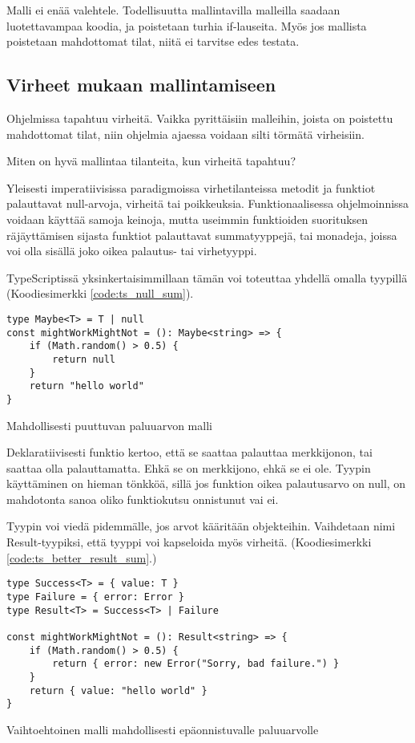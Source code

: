 Malli ei enää valehtele. Todellisuutta mallintavilla malleilla saadaan luotettavampaa koodia, ja poistetaan turhia if-lauseita. Myös jos mallista poistetaan mahdottomat tilat, niitä ei tarvitse edes testata.

\subsection{Virheet mukaan mallintamiseen}

Ohjelmissa tapahtuu virheitä. Vaikka pyrittäisiin malleihin, joista on poistettu mahdottomat tilat, niin ohjelmia ajaessa voidaan silti törmätä virheisiin.

Miten on hyvä mallintaa tilanteita, kun virheitä tapahtuu?

Yleisesti imperatiivisissa paradigmoissa virhetilanteissa metodit ja funktiot palauttavat null-arvoja, virheitä tai poikkeuksia.
Funktionaalisessa ohjelmoinnissa voidaan käyttää samoja keinoja, mutta useimmin funktioiden suorituksen räjäyttämisen sijasta funktiot palauttavat summatyyppejä, tai monadeja, joissa voi olla sisällä joko oikea palautus- tai virhetyyppi.

TypeScriptissä yksinkertaisimmillaan tämän voi toteuttaa yhdellä omalla tyypillä (Koodiesimerkki \ref{code:ts_null_sum}).

\begin{code}
    \begin{verbatim}
type Maybe<T> = T | null
const mightWorkMightNot = (): Maybe<string> => {
    if (Math.random() > 0.5) {
        return null
    }
    return "hello world"
}
    \end{verbatim}
    \caption{Mahdollisesti puuttuvan paluuarvon malli}
    \label{code:ts_null_sum}
\end{code}

Deklaratiivisesti funktio kertoo, että se saattaa palauttaa merkkijonon, tai saattaa olla palauttamatta. Ehkä se on merkkijono, ehkä se ei ole.
Tyypin käyttäminen on hieman tönkköä, sillä jos funktion oikea palautusarvo on null, on mahdotonta sanoa oliko funktiokutsu onnistunut vai ei.

Tyypin voi viedä pidemmälle, jos arvot kääritään objekteihin. Vaihdetaan nimi Result-tyypiksi, että tyyppi voi kapseloida myös virheitä. (Koodiesimerkki \ref{code:ts_better_result_sum}.)

\begin{code}
    \begin{verbatim}
type Success<T> = { value: T }
type Failure = { error: Error }
type Result<T> = Success<T> | Failure 

const mightWorkMightNot = (): Result<string> => {
    if (Math.random() > 0.5) {
        return { error: new Error("Sorry, bad failure.") }
    }
    return { value: "hello world" }
}
    \end{verbatim}
    \caption{Vaihtoehtoinen malli mahdollisesti epäonnistuvalle paluuarvolle}
    \label{code:ts_better_result_sum}
\end{code}


